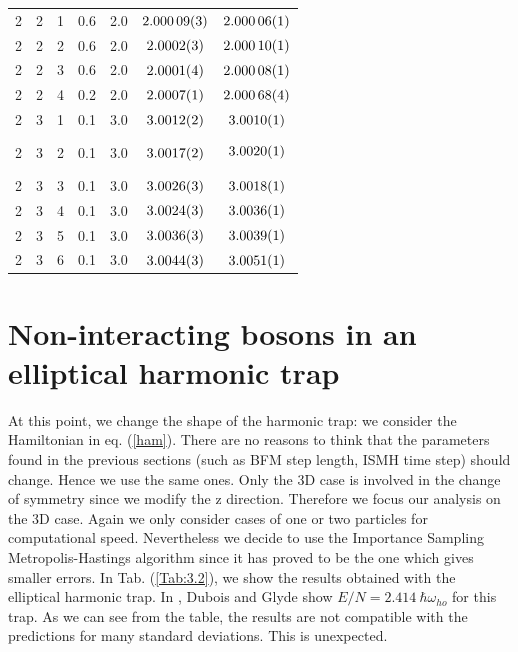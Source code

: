 \begin{table}[H]
\begin{tabular}{c c c c |c c c}
2 & 2 & 1 &0.6 & 2.0  & $\SI{2.00009\pm 0.00003}{}$ & $\SI{2.00006\pm 0.00001}{}$ \\
2 & 2 & 2 &0.6 & 2.0   & $\SI{2.0002\pm 0.0003}{}$ & $\SI{2.00010\pm 0.00001}{}$ \\
2 & 2 & 3 &0.6 & 2.0   & $\SI{2.0001\pm 0.0004}{}$ & $\SI{2.00008\pm 0.00001}{}$ \\
2 & 2 & 4 &0.2 & 2.0   & $\SI{2.0007\pm 0.0001}{}$ & $\SI{2.00068\pm 0.00004}{}$ \\ \hline 
2 & 3 & 1 &0.1 & 3.0   &   $\SI{3.0012\pm 0.0002}{}$&  $\SI{3.0010\pm 0.0001}{}$ \\
2 & 3 & 2 &0.1 & 3.0   &   $\SI{3.0017\pm 0.0002}{}$&  $$\SI{3.0020\pm 0.0001}{}$$ \\
2 & 3 & 3 &0.1 & 3.0   &  $\SI{3.0026\pm 0.0003}{}$&    $\SI{3.0018\pm 0.0001}{}$ \\
2 & 3 & 4 &0.1 & 3.0   &  $\SI{3.0024\pm 0.0003}{}$&   $\SI{3.0036\pm 0.0001}{}$ \\
2 & 3 & 5 &0.1 & 3.0  &  $\SI{3.0036\pm 0.0003}{}$  &  $\SI{3.0039\pm 0.0001}{}$  \\
2 & 3 & 6 &0.1 & 3.0   &  $\SI{3.0044\pm 0.0003}{}$   & $\SI{3.0051\pm 0.0001}{}$  \\ 
\end{tabular}
\label{Tab:3}
\end{table} 

\section{Non-interacting bosons in an elliptical harmonic trap}
At this point, we change the shape of the harmonic trap: we consider the Hamiltonian in eq. (\ref{ham}). There are no reasons to think that the parameters found in the previous sections (such as BFM step length, ISMH time step) should change. Hence we use the same ones. Only the 3D case is involved in the change of symmetry since we modify the z direction. Therefore we focus our analysis on the 3D case. Again we only consider cases of one or two particles for computational speed. Nevertheless we decide to use the Importance Sampling Metropolis-Hastings algorithm since it has proved to be the one which gives smaller errors.  In Tab. (\ref{Tab:3.2}), we show the results obtained with the elliptical harmonic trap. In \cite{vmcarticle}, Dubois and Glyde show $E/N=2.414\ \hbar\omega_{ho}$ for this trap. As we can see from the table, the results are not compatible with the predictions for many standard deviations. This is unexpected. 

